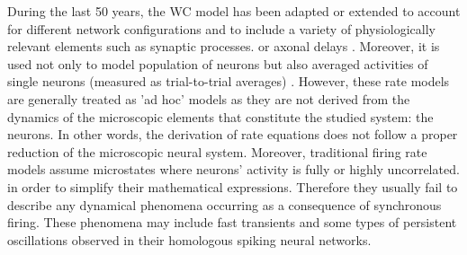 During the last 50 years, the WC model has been adapted or extended to
account for different network configurations and to include a variety of
physiologically relevant elements such as synaptic processes\cita. or axonal
delays \citep{Coombes2003,Roxin2005,Coombes2009,Roxin2011}. Moreover,
it is used not only to model population  
of neurons but also averaged activities of single neurons (measured as
trial-to-trial averages) \citep[e.g.][]{Grossberg1973}. However, these rate models are
generally treated as 'ad hoc' models as 
they are not derived from the dynamics of the microscopic elements
that constitute the studied system: the neurons. 
In other words, the derivation of rate equations does not
follow a proper reduction of the microscopic neural system. Moreover,
traditional firing rate models assume microstates  where neurons'
activity is fully or highly uncorrelated. in order to simplify
their mathematical expressions. Therefore they usually
fail to describe any dynamical phenomena occurring as a consequence
of synchronous firing. These phenomena may 
include fast transients and some types of persistent oscillations
observed in their homologous spiking neural networks.


